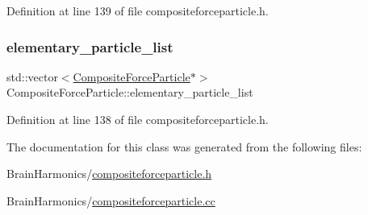 Definition at line 139 of file compositeforceparticle.\+h.

\mbox{\label{class_composite_force_particle_a1f5ab59857b8517af69205178f04abe9}} 
\subsubsection{\texorpdfstring{elementary\+\_\+particle\+\_\+list}{elementary\_particle\_list}}
{\footnotesize\ttfamily std\+::vector$<$\hyperlink{class_composite_force_particle}{Composite\+Force\+Particle}$\ast$$>$ Composite\+Force\+Particle\+::elementary\+\_\+particle\+\_\+list\hspace{0.3cm}{\ttfamily [protected]}}



Definition at line 138 of file compositeforceparticle.\+h.



The documentation for this class was generated from the following files\+:\begin{DoxyCompactItemize}
\item 
Brain\+Harmonics/\hyperlink{compositeforceparticle_8h}{compositeforceparticle.\+h}\item 
Brain\+Harmonics/\hyperlink{compositeforceparticle_8cc}{compositeforceparticle.\+cc}\end{DoxyCompactItemize}
